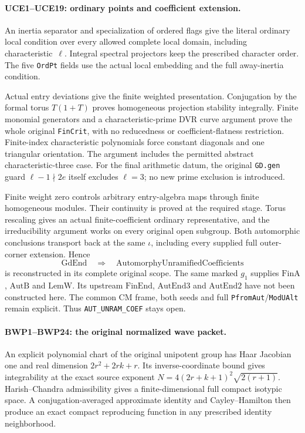 \paragraph{UCE1--UCE19: ordinary points and coefficient extension.}
An inertia separator and specialization of ordered flags give the
literal ordinary local condition over every allowed complete local
domain, including characteristic~\(\ell\). Integral spectral
projectors keep the prescribed character order. The five
\texttt{Ord\allowbreak Pt} fields use the actual local embedding and the full
away-inertia condition.

Actual entry deviations give the finite weighted presentation.
Conjugation by the formal torus \(T(1+T)\) proves homogeneous
projection stability integrally. Finite monomial generators and a
characteristic-prime DVR curve argument prove the whole original
\texttt{Fin\allowbreak Crit}, with no reducedness or coefficient-flatness
restriction. Finite-index characteristic polynomials force constant
diagonals and one triangular orientation. The argument includes
the permitted abstract characteristic-three case. For the final
arithmetic datum, the original \texttt{GD.\allowbreak gen} guard
\(\ell-1\nmid 2e\) itself excludes \(\ell=3\); no new
prime exclusion is introduced.

Finite weight zero controls arbitrary entry-algebra maps through
finite homogeneous modules. Their continuity is proved at the
required stage. Torus rescaling gives an actual finite-coefficient
ordinary representative, and the irreducibility argument works on
every original open subgroup. Both automorphic conclusions transport
back at the same \(\iota\), including every supplied full
outer-corner extension. Hence
\[
 \mathrm{GdEnd}\quad\Longrightarrow\quad
 \mathrm{AutomorphyUnramifiedCoefficients}
\]
is reconstructed in its complete original scope. The same marked
\(g_1\) supplies \(\mathrm{FinA}\), \(\mathrm{AutB}\) and
\(\mathrm{LemW}\). Its upstream \(\mathrm{FinEnd}\),
\(\mathrm{AutEnd3}\) and \(\mathrm{AutEnd2}\) have not been
constructed here. The common CM frame, both seeds and full
\texttt{Pfrom\allowbreak Aut}/\texttt{Mod\allowbreak UAlt} remain explicit.
Thus \texttt{AUT\_\allowbreak UNRAM\_\allowbreak COEF} stays open.

\paragraph{BWP1--BWP24: the original normalized wave packet.}
An explicit polynomial chart of the original unipotent group has
Haar Jacobian one and real dimension \(2r^2+2rk+r\).
Its inverse-coordinate bound gives integrability at the exact source
exponent \(N=4(2r+k+1)^2\sqrt{2(r+1)}\).
Harish--Chandra admissibility gives a finite-dimensional full compact
isotypic space. A conjugation-averaged approximate identity and
Cayley--Hamilton then produce an exact compact reproducing function
in any prescribed identity neighborhood.

